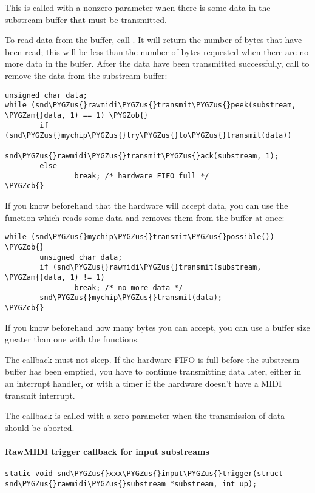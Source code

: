 \documentclass[a4paper,8pt,english]{sphinxmanual}
\def\PYGZus{\char`\_}
\def\PYGZob{\char`\{}
\def\PYGZcb{\char`\}}
\def\PYGZam{\char`\&}
\begin{document}
This is called with a nonzero  parameter when there is some data
in the substream buffer that must be transmitted.

To read data from the buffer, call
. It will return the number
of bytes that have been read; this will be less than the number of bytes
requested when there are no more data in the buffer. After the data have
been transmitted successfully, call
 to remove the data from the
substream buffer:

\begin{Verbatim}[commandchars=\\\{\}]
unsigned char data;
while (snd\PYGZus{}rawmidi\PYGZus{}transmit\PYGZus{}peek(substream, \PYGZam{}data, 1) == 1) \PYGZob{}
        if (snd\PYGZus{}mychip\PYGZus{}try\PYGZus{}to\PYGZus{}transmit(data))
                snd\PYGZus{}rawmidi\PYGZus{}transmit\PYGZus{}ack(substream, 1);
        else
                break; /* hardware FIFO full */
\PYGZcb{}
\end{Verbatim}

If you know beforehand that the hardware will accept data, you can use
the  function which reads some
data and removes them from the buffer at once:

\begin{Verbatim}[commandchars=\\\{\}]
while (snd\PYGZus{}mychip\PYGZus{}transmit\PYGZus{}possible()) \PYGZob{}
        unsigned char data;
        if (snd\PYGZus{}rawmidi\PYGZus{}transmit(substream, \PYGZam{}data, 1) != 1)
                break; /* no more data */
        snd\PYGZus{}mychip\PYGZus{}transmit(data);
\PYGZcb{}
\end{Verbatim}

If you know beforehand how many bytes you can accept, you can use a
buffer size greater than one with the
 functions.

The  callback must not sleep. If the hardware FIFO is full
before the substream buffer has been emptied, you have to continue
transmitting data later, either in an interrupt handler, or with a
timer if the hardware doesn't have a MIDI transmit interrupt.

The  callback is called with a zero  parameter when
the transmission of data should be aborted.


\paragraph{RawMIDI trigger callback for input substreams}
\label{sound/kernel-api/writing-an-alsa-driver:rawmidi-trigger-callback-for-input-substreams}
\begin{Verbatim}[commandchars=\\\{\}]
static void snd\PYGZus{}xxx\PYGZus{}input\PYGZus{}trigger(struct snd\PYGZus{}rawmidi\PYGZus{}substream *substream, int up);
\end{Verbatim}
\end{document}

